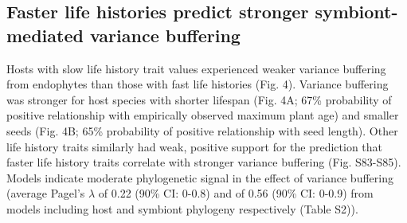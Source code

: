 \documentclass[lineno, sn-basic]{sn-jnl}%
\begin{document}
\subsection*{Faster life histories predict stronger symbiont-mediated variance buffering}
Hosts with slow life history trait values experienced weaker variance buffering from endophytes than those with fast life histories (Fig. 4).
Variance buffering was stronger for host species with shorter lifespan (Fig. 4A; 67\% probability of positive relationship with empirically observed maximum plant age) and smaller seeds (Fig. 4B; 65\% probability of positive relationship with seed length).
Other life history traits similarly had weak, positive support for the prediction that faster life history traits correlate with stronger variance buffering (Fig. S83-S85). 
Models indicate moderate phylogenetic signal in the effect of variance buffering (average Pagel's $\lambda$ of 0.22 (90\% CI: 0-0.8) and of 0.56 (90\% CI: 0-0.9) from models including host and symbiont phylogeny respectively (Table S2)).
\end{document}
